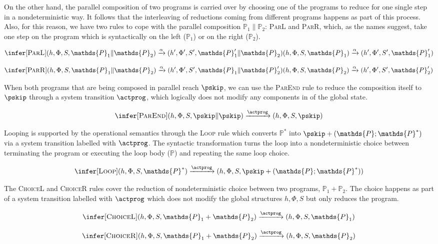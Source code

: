 On the other hand, the parallel composition of two programs is carried over by choosing one of the programs to reduce for one single step in a nondeterministic way. It follows that the interleaving of reductions coming from different programs happens as part of this process. Also, for this reason, we have two rules to cope with the parallel composition $\mathds{P}_1 \| \mathds{P}_2$: \textsc{ParL} and \textsc{ParR}, which, as the names suggest, take one step on the program which is syntactically on the left ($\mathds{P}_1$) or on the right ($\mathds{P}_2$).

\[
\infer[\textsc{ParL}]
{
	 (h, \Phi, S, \mathds{P}_1 \| \mathds{P}_2)
	\xrightarrow{\alpha}
	(h', \Phi', S', \mathds{P}_1' \| \mathds{P}_2)
}
{
	 (h, \Phi, S, \mathds{P}_1)
	\xrightarrow{\alpha}
	(h', \Phi', S', \mathds{P}_1')
}
\]

\[
\infer[\textsc{ParR}]
{
	 (h, \Phi, S, \mathds{P}_1 \| \mathds{P}_2)
	\xrightarrow{\alpha}
	(h', \Phi', S', \mathds{P}_1 \| \mathds{P}_2')
}
{
	 (h, \Phi, S, \mathds{P}_2)
	\xrightarrow{\alpha}
	(h', \Phi', S', \mathds{P}_2')
}
\]

When both programs that are being composed in parallel reach $\pskip$, we can use the \textsc{ParEnd} rule to reduce the composition itself to $\pskip$ through a system transition $\actprog$, which logically does not modify any components in of the global state.

\[
\infer[\textsc{ParEnd}]
{
	 (h, \Phi, S, \pskip \| \pskip)
	\xrightarrow{\actprog}
	(h, \Phi, S, \pskip)
}
{}
\]

Looping is supported by the operational semantics through the \textsc{Loop} rule which converts $\mathds{P}^*$ into $\pskip + (\mathds{P} ; \mathds{P}^*)$ via a system transition labelled with $\actprog$. The syntactic transformation turns the loop into a nondeterministic choice between terminating the program or executing the loop body ($\mathds{P}$) and repeating the same loop choice.

\[
\infer[\textsc{Loop}]
{
	 (h, \Phi, S, \mathds{P}^*)
	\xrightarrow{\actprog}
	(h, \Phi, S, \pskip + (\mathds{P} ; \mathds{P}^*))
}
{}
\]

The \textsc{ChoiceL} and \textsc{ChoiceR} rules cover the reduction of nondeterministic choice between two programs, $\mathds{P}_1 + \mathds{P}_2$. The choice happens as part of a system transition labelled with $\actprog$ which does not modify the global structures $h, \Phi, S$ but only reduces the program.

\[
\infer[\textsc{ChoiceL}]
{
	 (h, \Phi, S, \mathds{P}_1 + \mathds{P}_2)
	\xrightarrow{\actprog}
	(h, \Phi, S, \mathds{P}_1)
}
{}
\]

\[
\infer[\textsc{ChoiceR}]
{
	 (h, \Phi, S, \mathds{P}_1 + \mathds{P}_2)
	\xrightarrow{\actprog}
	(h, \Phi, S, \mathds{P}_2)
}
{}
\]